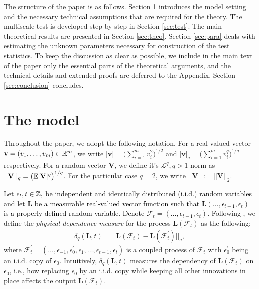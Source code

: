 \documentclass[a4paper,12pt]{article}
\begin{document}
The structure of the paper is as follows. Section \ref{sec:model} introduces the model setting and the necessary technical assumptions that are required for the theory. The multiscale test is developed step by step in Section \ref{sec:test}. The main theoretical results are presented in Section \ref{sec:theo}. Section \ref{sec:para} deals with estimating the unknown parameters necessary for construction of the test statistics. To keep the discussion as clear as possible, we include in the main text of the paper only the essential parts of the theoretical arguments, and the technical details and extended proofs are deferred to the Appendix. Section \ref{sec:conclusion} concludes.


\section{The model}\label{sec:model}

Throughout the paper, we adopt the following notation. For a real-valued vector \linebreak $\mathbf{v} = (v_1, \ldots, v_m)\in\mathbb{R}^m$, we write $|\mathbf{v}| = \big(\sum_{i=1}^m v_i^2\big)^{1/2}$ and $|\mathbf{v}|_q = \big(\sum_{i=1}^m v_i^q\big)^{1/q}$ respectively. For a random vector $\mathbf{V}$, we define it's $\mathcal{L}^q, q>1$ norm as $||\mathbf{V}||_q = \big(\mathbb{E} |\mathbf{V}|^q\big)^{1/q}$. For the particular case $q = 2$, we write $||\mathbf{V}|| := ||\mathbf{V}||_2$.

\textcolor{black}{Let $\epsilon_t, t \in \mathbb{Z},$ be independent and identically distributed (i.i.d.) random variables and let $\mathbf{L}$ be a measurable real-valued vector function such that $\mathbf{L}(\ldots, \epsilon_{t-1}, \epsilon_t)$ is a properly defined random variable. Denote $\mathcal{F}_t  = (\ldots, \epsilon_{t-1}, \epsilon_t)$.}  Following \cite{Wu2005}, we define the \textit{physical dependence measure} for the process $\mathbf{L}(\mathcal{F}_t)$ as the following:
\begin{align}\label{eq:physical_dep}
 \delta_q(\mathbf{L}, t) = || \mathbf{L}(\mathcal{F}_t) - \mathbf{L}(\mathcal{F}_t^\prime) ||_q,
\end{align}
where $\mathcal{F}_t^\prime  = (\ldots, \epsilon_{-1}, \epsilon^\prime_0, \epsilon_1, \ldots, \epsilon_{t-1}, \epsilon_t)$ is a coupled process of $\mathcal{F}_t$ with $\epsilon_0^\prime$ being an i.i.d. copy of $\epsilon_0$. Intuitively, $\delta_q(\mathbf{L}, t)$ measures the dependency of $\mathbf{L}(\mathcal{F}_t)$ on $\epsilon_0$, i.e., how replacing $\epsilon_0$ by an i.i.d. copy while keeping all other innovations in place affects the output $\mathbf{L}(\mathcal{F}_t)$.
\end{document}
